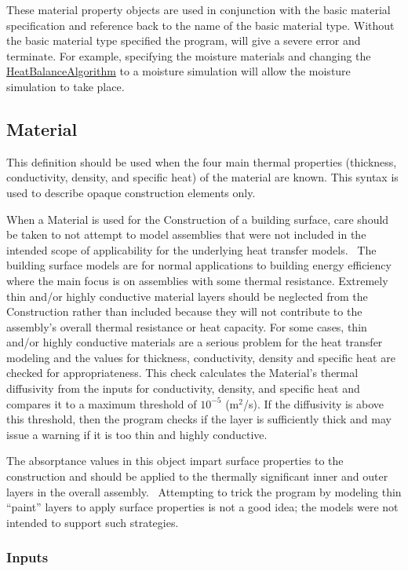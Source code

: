 These material property objects are used in conjunction with the basic material specification and reference back to the name of the basic material type. Without the basic material type specified the program, will give a severe error and terminate. For example, specifying the moisture materials and changing the \hyperref[heatbalancealgorithm]{HeatBalanceAlgorithm} to a moisture simulation will allow the moisture simulation to take place.

\subsection{Material}\label{material}

This definition should be used when the four main thermal properties (thickness, conductivity, density, and specific heat) of the material are known. This syntax is used to describe opaque construction elements only.

When a Material is used for the Construction of a building surface, care should be taken to not attempt to model assemblies that were not included in the intended scope of applicability for the underlying heat transfer models.~ The building surface models are for normal applications to building energy efficiency where the main focus is on assemblies with some thermal resistance. Extremely thin and/or highly conductive material layers should be neglected from the Construction rather than included because they will not contribute to the assembly's overall thermal resistance or heat capacity. For some cases, thin and/or highly conductive materials are a serious problem for the heat transfer modeling and the values for thickness, conductivity, density and specific heat are checked for appropriateness. This check calculates the Material's thermal diffusivity from the inputs for conductivity, density, and specific heat and compares it to a maximum threshold of $10^{-5}$ (m\(^{2}\)/s). If the diffusivity is above this threshold, then the program checks if the layer is sufficiently thick and may issue a warning if it is too thin and highly conductive.

The absorptance values in this object impart surface properties to the construction and should be applied to the thermally significant inner and outer layers in the overall assembly.~ Attempting to trick the program by modeling thin ``paint'' layers to apply surface properties is not a good idea; the models were not intended to support such strategies.

\subsubsection{Inputs}\label{inputs-046}

